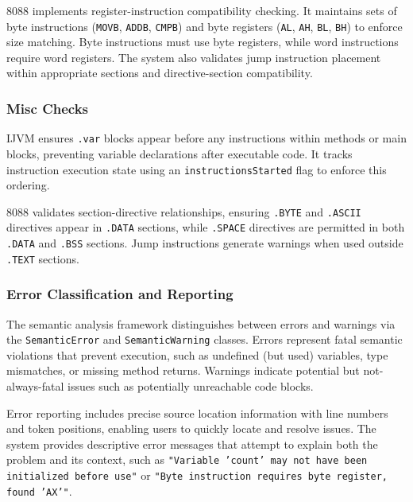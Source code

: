 \documentclass[11pt]{article}
\begin{document}
8088 implements register-instruction compatibility checking. It maintains sets of byte instructions (\texttt{MOVB}, \texttt{ADDB}, \texttt{CMPB}) and byte registers (\texttt{AL}, \texttt{AH}, \texttt{BL}, \texttt{BH}) to enforce size matching. Byte instructions must use byte registers, while word instructions require word registers. The system also validates jump instruction placement within appropriate sections and directive-section compatibility.

\subsubsection{Misc Checks}
IJVM ensures \texttt{.var} blocks appear before any instructions within methods or main blocks, preventing variable declarations after executable code. It tracks instruction execution state using an \texttt{instructionsStarted} flag to enforce this ordering.

8088 validates section-directive relationships, ensuring \texttt{.BYTE} and \texttt{.ASCII} directives appear in \texttt{.DATA} sections, while \texttt{.SPACE} directives are permitted in both \texttt{.DATA} and \texttt{.BSS} sections. Jump instructions generate warnings when used outside \texttt{.TEXT} sections.

\subsubsection{Error Classification and Reporting} 
The semantic analysis framework distinguishes between errors and warnings via the \texttt{SemanticError} and \texttt{SemanticWarning} classes. Errors represent fatal semantic violations that prevent execution, such as undefined (but used) variables, type mismatches, or missing method returns. Warnings indicate potential but not-always-fatal issues such as potentially unreachable code blocks.

Error reporting includes precise source location information with line numbers and token positions, enabling users to quickly locate and resolve issues. The system provides descriptive error messages that attempt to explain both the problem and its context, such as \texttt{"Variable 'count' may not have been initialized before use"} or \texttt{"Byte instruction requires byte register, found 'AX'"}.
\end{document}
